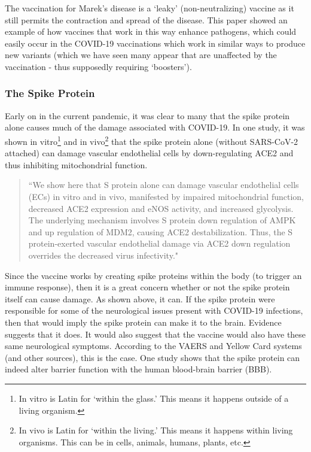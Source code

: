 \documentclass[10pt, a4paper, twocolumn]{book}
\begin{document}
The vaccination for Marek's disease is a `leaky' (non-neutralizing) vaccine as it still permits the contraction and spread of the disease. This paper showed an example of how vaccines that work in this way enhance pathogens, which could easily occur in the COVID-19 vaccinations which work in similar ways to produce new variants (which we have seen many appear that are unaffected by the vaccination - thus supposedly requiring `boosters').






\subsubsection{The Spike Protein}

Early on in the current pandemic, it was clear to many that the spike protein alone causes much of the damage associated with COVID-19. In one study, it was shown in vitro\footnote{In vitro is Latin for `within the glass.' This means it happens outside of a living organism.} and in vivo\footnote{In vivo is Latin for `within the living.' This means it happens within living organisms. This can be in cells, animals, humans, plants, etc.} that the spike protein alone (without SARS-CoV-2 attached) can damage vascular endothelial cells by down-regulating ACE2 and thus inhibiting mitochondrial function. 

\begin{quotation}
	``We show here that S protein alone can damage vascular endothelial cells (ECs) in vitro and in vivo, manifested by impaired mitochondrial function, decreased ACE2 expression and eNOS activity, and increased glycolysis. The underlying mechanism involves S protein down regulation of AMPK and up regulation of MDM2, causing ACE2 destabilization. Thus, the S protein-exerted vascular endothelial damage via ACE2 down regulation overrides the decreased virus infectivity." \citep{SpikeProteinDownregulation}
\end{quotation}

Since the vaccine works by creating spike proteins within the body (to trigger an immune response), then it is a great concern whether or not the spike protein itself can cause damage. As shown above, it can. If the spike protein were responsible for some of the neurological issues present with COVID-19 infections, then that would imply the spike protein can make it to the brain. Evidence suggests that it does. It would also suggest that the vaccine would also have these same neurological symptoms. According to the VAERS and Yellow Card systems (and other sources), this is the case. One study shows that the spike protein can indeed alter barrier function with the human blood-brain barrier (BBB).
\end{document}
